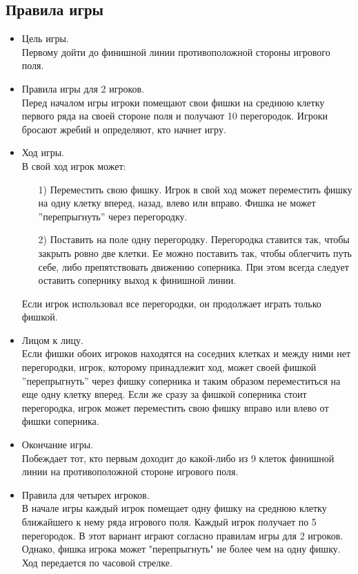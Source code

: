 \documentclass[a4paper]{article}
\begin{document}
\subsection{Правила игры}
\begin{itemize}
\item Цель игры.\\
Первому дойти до финишной линии противоположной стороны игрового поля.

\item Правила игры для 2 игроков.\\
Перед началом игры игроки помещают свои фишки на среднюю клетку первого ряда на своей стороне поля и получают 10 перегородок.  
Игроки бросают жребий и определяют, кто начнет игру.

\item Ход игры. \\
В свой ход игрок может:   \\
\begin{itemize}
\item[1)] Переместить свою фишку. Игрок в свой ход может переместить фишку на одну клетку вперед, назад, влево или вправо.
Фишка не может ''перепрыгнуть'' через перегородку.
\item[2)] Поставить на поле одну перегородку. Перегородка ставится так, чтобы закрыть ровно две клетки. Ее можно поставить так, чтобы облегчить путь себе, либо препятствовать движению соперника. При этом всегда следует оставить сопернику выход к финишной линии.
\end{itemize}  
Если игрок использовал все перегородки, он продолжает играть только фишкой.

\item Лицом к лицу. \\
Если фишки обоих игроков находятся на соседних клетках и между ними нет перегородки, игрок, которому принадлежит ход, может своей фишкой ''перепрыгнуть'' через фишку соперника и таким образом переместиться на еще одну клетку вперед. 
Если же сразу за фишкой соперника стоит перегородка, игрок может переместить свою фишку вправо или влево от фишки соперника. 

\item Окончание игры. \\
Побеждает тот, кто первым доходит до какой-либо из 9 клеток финишной линии на противоположной стороне игрового поля.

\item Правила для четырех игроков. \\
В начале игры каждый игрок помещает одну фишку на среднюю клетку ближайшего к нему ряда игрового поля. Каждый игрок получает по 5 перегородок. В этот вариант играют согласно правилам игры для 2 игроков. Однако, фишка игрока может "перепрыгнуть" не более чем на одну фишку. Ход передается по часовой стрелке.


\end{itemize}
\end{document}
